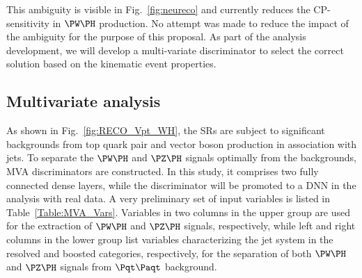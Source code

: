 \documentclass[a4paper,11pt]{article}
\newcommand{\Pt}{{{\Pqt}}\xspace}
\newcommand{\PAt}{{{{\Paqt}}}\xspace}
\begin{document}
This ambiguity is visible in Fig.~\ref{fig:neureco} and currently reduces the CP-sensitivity in $\PW\PH$ production. 
No attempt was made to reduce the impact of the ambiguity for the purpose of this proposal. 
As part of the analysis development, we will develop a multi-variate discriminator to select the correct solution based on the kinematic event properties. %

\subsection{Multivariate analysis}

As shown in Fig.~\ref{fig:RECO_Vpt_WH}, the SRs are subject to significant backgrounds from top quark pair  and vector boson production in association with jets.
To separate the  $\PW\PH$ and $\PZ\PH$ signals optimally from the backgrounds, MVA discriminators are constructed. 
In this study, it comprises two fully connected dense layers, while the discriminator will be promoted to a DNN in the analysis with real data.
A very preliminary set of input variables is listed in Table~\ref{Table:MVA_Vars}.
Variables in two columns in the upper group are used for the extraction of $\PW\PH$ and $\PZ\PH$ signals, respectively, while
left and right columns in the lower group list variables characterizing the jet system in the resolved and boosted categories, respectively, for the separation of both $\PW\PH$ and $\PZ\PH$ signals from $\Pt\PAt$ background.
\end{document}
